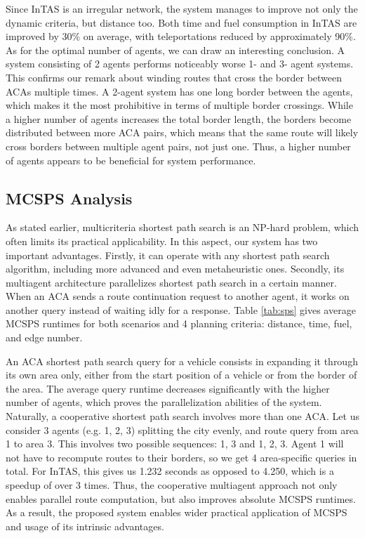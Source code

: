 \documentclass[sigconf]{aamas}
\begin{document}
Since InTAS is an irregular network, the system manages to improve not only the dynamic criteria, but distance too. Both time and fuel consumption in InTAS are improved by 30\% on average, with teleportations reduced by approximately 90\%. As for the optimal number of agents, we can draw an interesting conclusion. A system consisting of 2 agents performs noticeably worse 1- and 3- agent systems. This confirms our remark about winding routes that cross the border between ACAs multiple times. A 2-agent system has one long border between the agents, which makes it the most prohibitive in terms of multiple border crossings. While a higher number of agents increases the total border length, the borders become distributed between more ACA pairs, which means that the same route will likely cross borders between multiple agent pairs, not just one. Thus, a higher number of agents appears to be beneficial for system performance.

\subsection{MCSPS Analysis}
As stated earlier, multicriteria shortest path search is an NP-hard problem, which often limits its practical applicability. In this aspect, our system has two important advantages. Firstly, it can operate with any shortest path search algorithm, including more advanced and even metaheuristic ones. Secondly, its multiagent architecture parallelizes shortest path search in a certain manner. When an ACA sends a route continuation request to another agent, it works on another query instead of waiting idly for a response. Table \ref{tab:sps} gives average MCSPS runtimes for both scenarios and 4 planning criteria: distance, time, fuel, and edge number.

An ACA shortest path search query for a vehicle consists in expanding it through its own area only, either from the start position of a vehicle or from the border of the area. The average query runtime decreases significantly with the higher number of agents, which proves the parallelization abilities of the system. Naturally, a cooperative shortest path search involves more than one ACA. Let us consider 3 agents (e.g. 1, 2, 3) splitting the city evenly, and route query from area 1 to area 3. This involves two possible sequences: 1, 3 and 1, 2, 3. Agent 1 will not have to recompute routes to their borders, so we get 4 area-specific queries in total. For InTAS, this gives us 1.232 seconds as opposed to 4.250, which is a speedup of over 3 times. Thus, the cooperative multiagent approach not only enables parallel route computation, but also improves absolute MCSPS runtimes. As a result, the proposed system enables wider practical application of MCSPS and usage of its intrinsic advantages.
\end{document}
